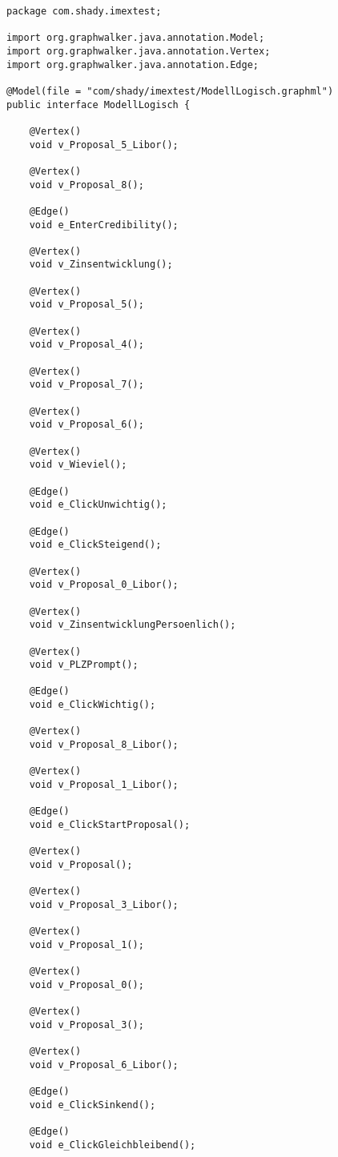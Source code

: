 \begin{lstlisting}[caption=ModellLogisch.java, label=code:gw_generated]
package com.shady.imextest;

import org.graphwalker.java.annotation.Model;
import org.graphwalker.java.annotation.Vertex;
import org.graphwalker.java.annotation.Edge;

@Model(file = "com/shady/imextest/ModellLogisch.graphml")
public interface ModellLogisch {

    @Vertex()
    void v_Proposal_5_Libor();

    @Vertex()
    void v_Proposal_8();

    @Edge()
    void e_EnterCredibility();

    @Vertex()
    void v_Zinsentwicklung();

    @Vertex()
    void v_Proposal_5();

    @Vertex()
    void v_Proposal_4();

    @Vertex()
    void v_Proposal_7();

    @Vertex()
    void v_Proposal_6();

    @Vertex()
    void v_Wieviel();

    @Edge()
    void e_ClickUnwichtig();

    @Edge()
    void e_ClickSteigend();

    @Vertex()
    void v_Proposal_0_Libor();

    @Vertex()
    void v_ZinsentwicklungPersoenlich();

    @Vertex()
    void v_PLZPrompt();

    @Edge()
    void e_ClickWichtig();

    @Vertex()
    void v_Proposal_8_Libor();

    @Vertex()
    void v_Proposal_1_Libor();

    @Edge()
    void e_ClickStartProposal();

    @Vertex()
    void v_Proposal();

    @Vertex()
    void v_Proposal_3_Libor();

    @Vertex()
    void v_Proposal_1();

    @Vertex()
    void v_Proposal_0();

    @Vertex()
    void v_Proposal_3();

    @Vertex()
    void v_Proposal_6_Libor();

    @Edge()
    void e_ClickSinkend();

    @Edge()
    void e_ClickGleichbleibend();


\end{lstlisting}
